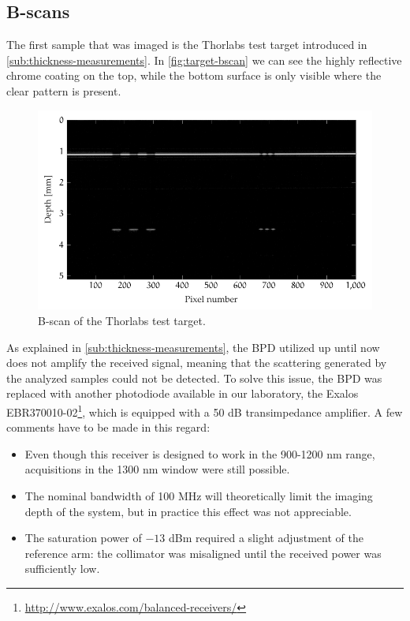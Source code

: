 \subsection{B-scans}
The first sample that was imaged is the Thorlabs test target introduced in \autoref{sub:thickness-measurements}. In \autoref{fig:target-bscan} we can see the highly reflective chrome coating on the top, while the bottom surface is only visible where the clear pattern is present.
\begin{figure}[hbt]
	\centering
	\includegraphics[width=0.8\linewidth]{gfx/ch4/axsun/target-bscan}
	\caption{B-scan of the Thorlabs test target.}\label{fig:target-bscan}
\end{figure}%


As explained in \autoref{sub:thickness-measurements}, the BPD utilized up until now does not amplify the received signal, meaning that the scattering generated by the analyzed samples could not be detected. To solve this issue, the BPD was replaced with another photodiode available in our laboratory, the Exalos EBR370010-02\footnote{\url{http://www.exalos.com/balanced-receivers/}}, which is equipped with a 50 dB transimpedance amplifier. A few comments have to be made in this regard:
\begin{itemize}
	\item Even though this receiver is designed to work in the 900-1200 nm range, acquisitions in the 1300 nm window were still possible. 
	
	\item The nominal bandwidth of 100 MHz will theoretically limit the imaging depth of the system, but in practice this effect was not appreciable. 
	
	\item The saturation power of $-13$ dBm required a slight adjustment of the reference arm: the collimator was misaligned until the received power was sufficiently low. 
\end{itemize}

